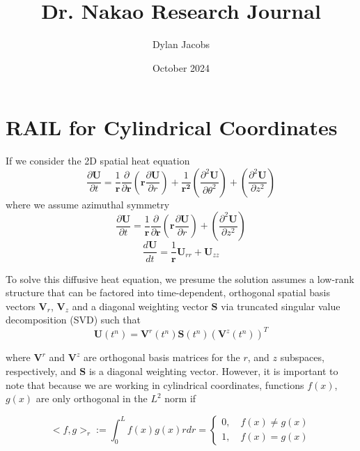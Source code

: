 \documentclass{article}
\title{Dr. Nakao Research Journal}
\author{Dylan Jacobs}
\date{October 2024}
\begin{document}
\maketitle

\section{RAIL for Cylindrical Coordinates}
If we consider the 2D spatial heat equation
\begin{equation}
    \frac{\partial \mathbf{U}}{\partial t} = \frac{1}{\mathbf{r}}\frac{\partial}{\partial \mathbf{r}}\left(\mathbf{r}\frac{\partial \mathbf{U}}{\partial r}\right) + \frac{1}{\mathbf{r^2}}\left(\frac{\partial ^2 \mathbf{U}}{\partial \theta^2
    }\right) + \left(\frac{\partial ^2 \mathbf{U}}{\partial z^2
    }\right)
\end{equation}
where we assume azimuthal symmetry
\begin{equation}
    \frac{\partial \mathbf{U}}{\partial t} = \frac{1}{\mathbf{r}}\frac{\partial}{\partial \mathbf{r}}\left(\mathbf{r}\frac{\partial \mathbf{U}}{\partial r}\right) + \left(\frac{\partial ^2 \mathbf{U}}{\partial z^2
    }\right)
\end{equation}
\begin{equation}
    \frac{d\mathbf{U}}{dt} = \frac{1}{\mathbf{r}}\mathbf{U}_{rr} + \mathbf{U}_{zz}
\end{equation}

To solve this diffusive heat equation, we presume the solution assumes a low-rank structure that can be factored into time-dependent, orthogonal spatial basis vectors $\mathbf{V}_r$, $\mathbf{V}_z$ and a diagonal weighting vector $\mathbf{S}$ via truncated singular value decomposition (SVD) such that
\begin{equation}
    \mathbf{U}(t^n) = \mathbf{V}^r(t^n) \mathbf{S}(t^n) (\mathbf{V}^{z}(t^n))^T
\end{equation}

where $\mathbf{V}^r$ and $\mathbf{V}^z$ are orthogonal basis matrices for the $r$, and $z$ subspaces, respectively, and $\mathbf{S}$ is a diagonal weighting vector. However, it is important to note that because we are working in cylindrical coordinates, functions $f(x)$, $g(x)$ are only orthogonal in the $L^2$ norm if

\begin{equation}
    <f, g>_r := \int_0^L f(x)g(x) r dr =
    \begin{cases}
         0, \quad f(x) \neq g(x) \\
         1, \quad f(x) = g(x)
    \end{cases}
	\label{eq:weighted-subspace-orthogonality}
\end{equation}
\end{document}
